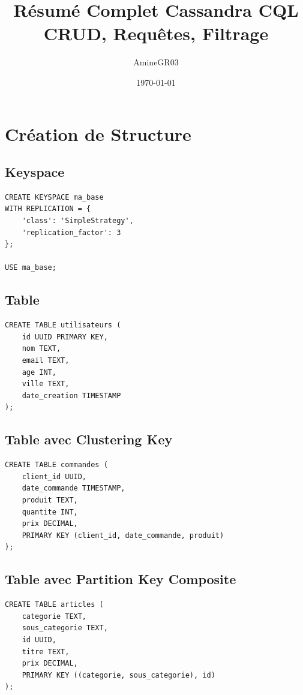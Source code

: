 \documentclass[11pt,a4paper]{article}
\title{Résumé Complet Cassandra CQL\\
\large CRUD, Requêtes, Filtrage}
\author{AmineGR03}
\date{\today}
\begin{document}
\maketitle

\tableofcontents
\newpage

\section{Création de Structure}

\subsection{Keyspace}

\begin{lstlisting}
CREATE KEYSPACE ma_base
WITH REPLICATION = {
    'class': 'SimpleStrategy',
    'replication_factor': 3
};

USE ma_base;
\end{lstlisting}

\subsection{Table}

\begin{lstlisting}
CREATE TABLE utilisateurs (
    id UUID PRIMARY KEY,
    nom TEXT,
    email TEXT,
    age INT,
    ville TEXT,
    date_creation TIMESTAMP
);
\end{lstlisting}

\subsection{Table avec Clustering Key}

\begin{lstlisting}
CREATE TABLE commandes (
    client_id UUID,
    date_commande TIMESTAMP,
    produit TEXT,
    quantite INT,
    prix DECIMAL,
    PRIMARY KEY (client_id, date_commande, produit)
);
\end{lstlisting}

\subsection{Table avec Partition Key Composite}

\begin{lstlisting}
CREATE TABLE articles (
    categorie TEXT,
    sous_categorie TEXT,
    id UUID,
    titre TEXT,
    prix DECIMAL,
    PRIMARY KEY ((categorie, sous_categorie), id)
);
\end{lstlisting}
\end{document}
